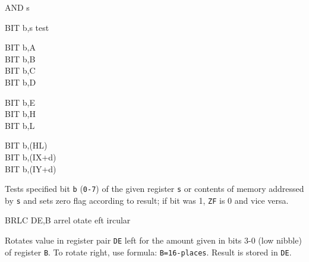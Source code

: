\begin{basedescript}{
    \desclabelstyle{\multilinelabel}
    \desclabelwidth{3cm}}
\begin{DetailItem}{AND s}
    \end{DetailItem}

    \pagebreak
    \begin{DetailItem}{BIT b,s}
        {test }
        {}

        \begin{DetailVariants}
            BIT b,A\\
            BIT b,B\\
            BIT b,C\\
            BIT b,D

            \columnbreak
            BIT b,E\\
            BIT b,H\\
            BIT b,L
			
            \columnbreak
            BIT b,(HL)\\
            BIT b,(IX+d)\\
            BIT b,(IY+d)
        \end{DetailVariants}

        Tests specified bit {\tt b} ({\tt 0-7}) of the given register {\tt s} or contents of memory addressed by {\tt s} and sets zero flag according to result; if bit was 1, {\tt ZF} is 0 and vice versa.

        \begin{DetailEffects}
            \FlagsBITr
        \end{DetailEffects}

        \begin{DetailTiming}
        \end{DetailTiming}

    \end{DetailItem}

    \begin{DetailItem}{BRLC DE,B\ZXN}
        {arrel otate eft ircular}
        {\SymBRLC}

        Rotates value in register pair {\tt DE} left for the amount given in bits 3-0 (low nibble) of register {\tt B}. To rotate right, use formula: {\tt B=16-places}. Result is stored in {\tt DE}.

        \begin{DetailEffects}
            \FlagsBRLC
        \end{DetailEffects}


\end{DetailItem}
\end{basedescript}
